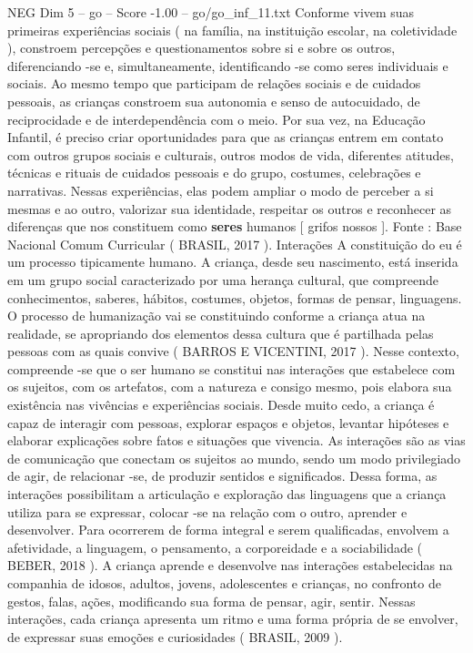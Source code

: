 \begin{textsample}{NEG Dim 5 – go – Score -1.00 – go/go\_inf\_11.txt}
Conforme vivem suas primeiras experiências sociais ( na família, na instituição escolar, na coletividade ), constroem percepções e questionamentos sobre si e sobre os outros, diferenciando -se e, simultaneamente, identificando -se como seres individuais e sociais.
Ao mesmo tempo que participam de relações sociais e de cuidados pessoais, as crianças constroem sua autonomia e senso de autocuidado, de reciprocidade e de interdependência com o meio.
Por sua vez, na Educação Infantil, é preciso criar oportunidades para que as crianças entrem em contato com outros grupos sociais e culturais, outros modos de vida, diferentes atitudes, técnicas e rituais de cuidados pessoais e do grupo, costumes, celebrações e narrativas.
Nessas experiências, elas podem ampliar o modo de perceber a si mesmas e ao outro, valorizar sua identidade, respeitar os outros e reconhecer as diferenças que nos constituem como \textbf{seres} humanos [ grifos nossos ].
Fonte : Base Nacional Comum Curricular ( BRASIL, 2017 ).
Interações A constituição do eu é um processo tipicamente humano.
A criança, desde seu nascimento, está inserida em um grupo social caracterizado por uma herança cultural, que compreende conhecimentos, saberes, hábitos, costumes, objetos, formas de pensar, linguagens.
O processo de humanização vai se constituindo conforme a criança atua na realidade, se apropriando dos elementos dessa cultura que é partilhada pelas pessoas com as quais convive ( BARROS E VICENTINI, 2017 ).
Nesse contexto, compreende -se que o ser humano se constitui nas interações que estabelece com os sujeitos, com os artefatos, com a natureza e consigo mesmo, pois elabora sua existência nas vivências e experiências sociais.
Desde muito cedo, a criança é capaz de interagir com pessoas, explorar espaços e objetos, levantar hipóteses e elaborar explicações sobre fatos e situações que vivencia.
As interações são as vias de comunicação que conectam os sujeitos ao mundo, sendo um modo privilegiado de agir, de relacionar -se, de produzir sentidos e significados.
Dessa forma, as interações possibilitam a articulação e exploração das linguagens que a criança utiliza para se expressar, colocar -se na relação com o outro, aprender e desenvolver.
Para ocorrerem de forma integral e serem qualificadas, envolvem a afetividade, a linguagem, o pensamento, a corporeidade e a sociabilidade ( BEBER, 2018 ).
A criança aprende e desenvolve nas interações estabelecidas na companhia de idosos, adultos, jovens, adolescentes e crianças, no confronto de gestos, falas, ações, modificando sua forma de pensar, agir, sentir.
Nessas interações, cada criança apresenta um ritmo e uma forma própria de se envolver, de expressar suas emoções e curiosidades ( BRASIL, 2009 ).

\end{textsample}
